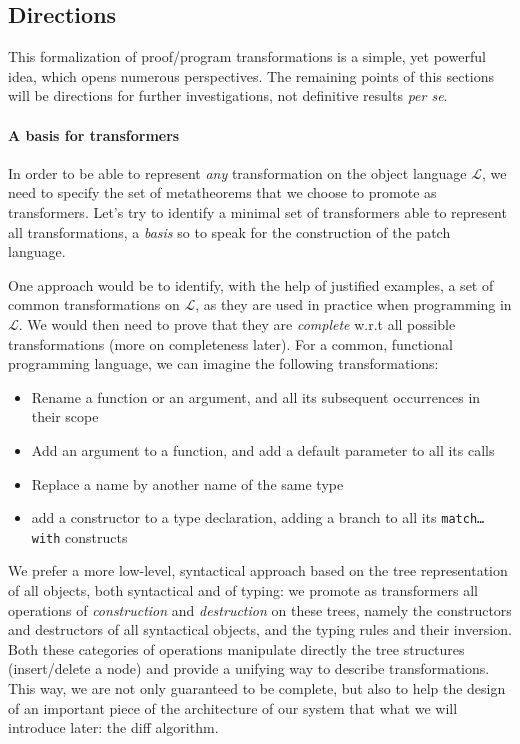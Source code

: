\documentclass[twoside,a4paper,12pt]{article}
\begin{document}
\subsection{Directions}

This formalization of proof/program transformations is a simple, yet
powerful idea, which opens numerous perspectives. The remaining
points of this sections will be directions for further investigations,
not definitive results \emph{per se}.

\paragraph{A basis for transformers}

In order to be able to represent \emph{any} transformation on the
object language $\mathcal L$, we need to specify the set of
metatheorems that we choose to promote as transformers. Let's try to
identify a minimal set of transformers able to represent all
transformations, a \emph{basis} so to speak for the construction of
the patch language.

One approach would be to identify, with the help of justified
examples, a set of common transformations on $\mathcal L$, as they are
used in practice when programming in $\mathcal L$. We would then need
to prove that they are \emph{complete} w.r.t all possible
transformations (more on completeness later). For a common, functional
programming language, we can imagine the following transformations:
\begin{itemize}
\item Rename a function or an argument, and all its subsequent
  occurrences in their scope
\item Add an argument to a function, and add a default parameter to
  all its calls
\item Replace a name by another name of the same type
\item add a constructor to a type declaration, adding a branch to all
  its \texttt{match\ldots with} constructs
\end{itemize}

We prefer a more low-level, syntactical approach based on the tree
representation of all objects, both syntactical and of typing: we
promote as transformers all operations of \emph{construction} and
\emph{destruction} on these trees, namely the constructors and
destructors of all syntactical objects, and the typing rules and their
inversion. Both these categories of operations manipulate directly the
tree structures (insert/delete a node) and provide a unifying way to
describe transformations. This way, we are not only guaranteed to be
complete, but also to help the design of an important piece of the
architecture of our system that what we will introduce later: the diff
algorithm.
\end{document}
